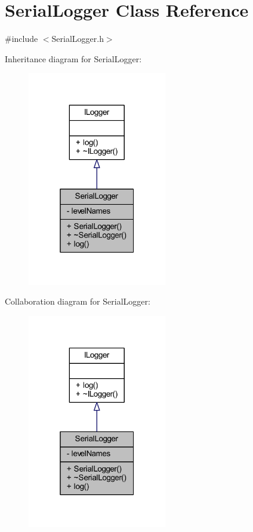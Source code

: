\hypertarget{class_serial_logger}{}\section{Serial\+Logger Class Reference}
\label{class_serial_logger}


{\ttfamily \#include $<$Serial\+Logger.\+h$>$}



Inheritance diagram for Serial\+Logger\+:
\nopagebreak
\begin{figure}[H]
\begin{center}
\leavevmode
\includegraphics[width=172pt]{class_serial_logger__inherit__graph}
\end{center}
\end{figure}


Collaboration diagram for Serial\+Logger\+:
\nopagebreak
\begin{figure}[H]
\begin{center}
\leavevmode
\includegraphics[width=172pt]{class_serial_logger__coll__graph}
\end{center}
\end{figure}
